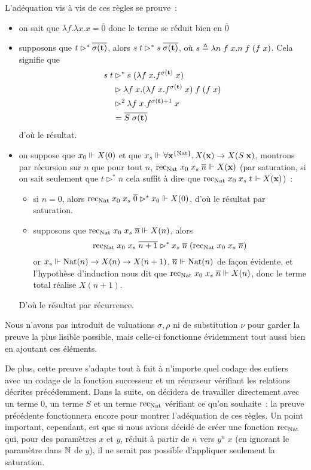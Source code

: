 \documentclass{article}
\begin{document}
L'adéquation vis à vis de ces règles se prouve~:
\begin{itemize}
    \item on sait que $\lambda f.\lambda x.x = \overline 0$ donc le terme se réduit bien en $\overline 0$
    \item supposons que $t\rhd^* \overline{\sigma(\mathbf{t})}$, alors $s\;t \rhd^* s\;\overline{\sigma(\mathbf{t})}$, où $s \triangleq \lambda n\;f\;x.n\;f\;(f\;x)$. Cela signifie que
    \begin{align*}
        s\;t&\rhd^* s\;(\lambda f\;x. f^{\sigma(\mathbf{t})}\;x)\\
        &\rhd \lambda f\;x. (\lambda f\;x. f^{\sigma(\mathbf{t})}\;x)\;f\;(f\;x)\\
        &\rhd^2 \lambda f\;x. f^{\sigma(\mathbf{t}) + 1}\;x\\
        &= \overline{S\;\sigma(\mathbf{t})}
    \end{align*}
    d'où le résultat.
    \item on suppose que $x_0 \Vdash X(0)$ et que $x_s \Vdash \forall \mathbf{x}^{\{\mathrm{Nat}\}}, X(\mathbf{x}) \to X(S\;\mathbf{x})$, montrons par récursion sur $n$ que pour tout $n$, $\mathrm{rec}_{\mathrm{Nat}}\;x_0\;x_s\;\overline n \Vdash X(\mathbf{x})$ (par saturation, si on sait seulement que $t \rhd^* \overline n$ cela suffit à dire que $\mathrm{rec}_{\mathrm{Nat}}\;x_0\;x_s\;t \Vdash X(\mathbf{x})$)~:
    \begin{itemize}
        \item si $n = 0$, alors $\mathrm{rec}_{\mathrm{Nat}}\;x_0\;x_s\;\overline 0 \rhd^* x_0 \Vdash X(0)$, d'où le résultat par saturation.
        \item supposons que $\mathrm{rec}_{\mathrm{Nat}}\;x_0\;x_s\;\overline n \Vdash X(n)$, alors
            \[\mathrm{rec}_{\mathrm{Nat}}\;x_0\;x_s\;\overline{n+1} \rhd^* x_s\;\overline n\;(\mathrm{rec}_{\mathrm{Nat}}\;x_0\;x_s\;\overline n)\]
        or $x_s \Vdash \mathrm{Nat}(n) \to X(n) \to X(n+1)$, $\overline n \Vdash \mathrm{Nat}(n)$ de façon évidente, et l'hypothèse d'induction nous dit que $\mathrm{rec}_{\mathrm{Nat}}\;x_0\;x_s\;\overline n \Vdash X(n)$, donc le terme total réalise $X(n+1)$.
    \end{itemize}
    D'où le résultat par récurrence.
\end{itemize}

Nous n'avons pas introduit de valuations $\sigma, \rho$ ni de substitution $\nu$ pour garder la preuve la plus lisible possible, mais celle-ci fonctionne évidemment tout aussi bien en ajoutant ces éléments.

De plus, cette preuve s'adapte tout à fait à n'importe quel codage des entiers avec un codage de la fonction successeur et un récurseur vérifiant les relations décrites précédemment. Dans la suite, on décidera de travailler directement avec un terme $0$, un terme $S$ et un terme $\mathrm{rec}_{\mathrm{Nat}}$ vérifiant ce qu'on souhaite~: la preuve précédente fonctionnera encore pour montrer l'adéquation de ces règles. Un point important, cependant, est que si nous avions décidé de créer une fonction $\mathrm{rec}_{\mathrm{Nat}}$ qui, pour des paramètres $x$ et $y$, réduit à partir de $\overline n$ vers $y^n\;x$ (en ignorant le paramètre dans $\mathbb{N}$ de $y$), il ne serait pas possible d'appliquer seulement la saturation.
\end{document}
